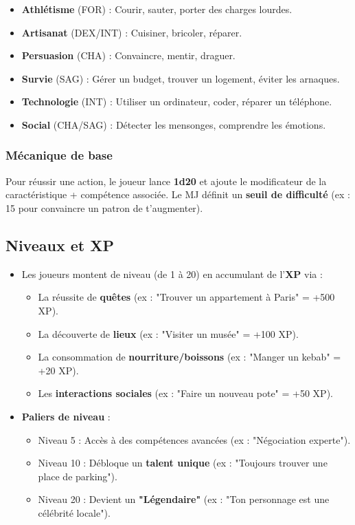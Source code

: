 \documentclass[11pt, a4paper]{article}
\begin{document}
\begin{itemize}
    \item \textbf{Athlétisme} (FOR) : Courir, sauter, porter des charges lourdes.
    \item \textbf{Artisanat} (DEX/INT) : Cuisiner, bricoler, réparer.
    \item \textbf{Persuasion} (CHA) : Convaincre, mentir, draguer.
    \item \textbf{Survie} (SAG) : Gérer un budget, trouver un logement, éviter les arnaques.
    \item \textbf{Technologie} (INT) : Utiliser un ordinateur, coder, réparer un téléphone.
    \item \textbf{Social} (CHA/SAG) : Détecter les mensonges, comprendre les émotions.
\end{itemize}

\subsubsection{Mécanique de base}
Pour réussir une action, le joueur lance \textbf{1d20} et ajoute le modificateur de la caractéristique + compétence associée. Le MJ définit un \textbf{seuil de difficulté} (ex : 15 pour convaincre un patron de t'augmenter).

\subsection{Niveaux et XP}
\begin{itemize}
    \item Les joueurs montent de niveau (de 1 à 20) en accumulant de l'\textbf{XP} via :
    \begin{itemize}
        \item La réussite de \textbf{quêtes} (ex : "Trouver un appartement à Paris" = +500 XP).
        \item La découverte de \textbf{lieux} (ex : "Visiter un musée" = +100 XP).
        \item La consommation de \textbf{nourriture/boissons} (ex : "Manger un kebab" = +20 XP).
        \item Les \textbf{interactions sociales} (ex : "Faire un nouveau pote" = +50 XP).
    \end{itemize}
    \item \textbf{Paliers de niveau} :
    \begin{itemize}
        \item Niveau 5 : Accès à des compétences avancées (ex : "Négociation experte").
        \item Niveau 10 : Débloque un \textbf{talent unique} (ex : "Toujours trouver une place de parking").
        \item Niveau 20 : Devient un \textbf{"Légendaire"} (ex : "Ton personnage est une célébrité locale").
    \end{itemize}
\end{itemize}
\end{document}
